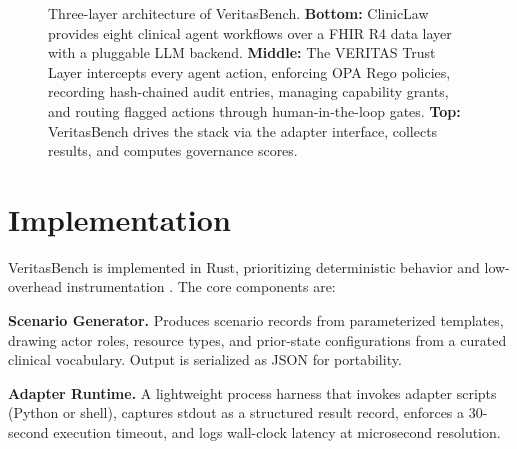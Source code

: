 \documentclass{article}
\begin{document}
\begin{figure}[t]
\begin{center}
  \caption{%
    Three-layer architecture of VeritasBench. \textbf{Bottom:} ClinicLaw
    provides eight clinical agent workflows over a FHIR R4 data layer with a
    pluggable LLM backend. \textbf{Middle:} The VERITAS Trust Layer intercepts
    every agent action, enforcing OPA Rego policies, recording hash-chained
    audit entries, managing capability grants, and routing flagged actions
    through human-in-the-loop gates. \textbf{Top:} VeritasBench drives the
    stack via the adapter interface, collects results, and computes governance
    scores.}
  \label{fig:architecture}
  \end{center}
  \vskip -0.1in
\end{figure}

\section{Implementation}
\label{sec:implementation}

VeritasBench is implemented in Rust, prioritizing deterministic behavior and
low-overhead instrumentation \cite{veritas2024}. The core components are:

\textbf{Scenario Generator.} Produces scenario records from parameterized
templates, drawing actor roles, resource types, and prior-state configurations
from a curated clinical vocabulary. Output is serialized as JSON for portability.

\textbf{Adapter Runtime.} A lightweight process harness that invokes
adapter scripts (Python or shell), captures stdout as a structured result
record, enforces a 30-second execution timeout, and logs wall-clock latency at
microsecond resolution.
\end{document}
